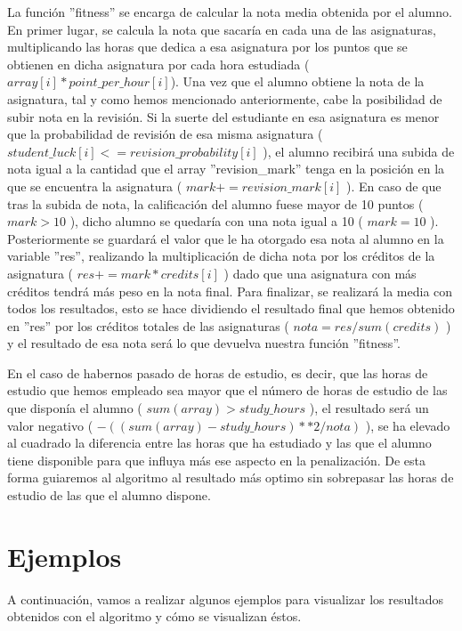 \documentclass[11pt, a4paper, titlepage]{article}
\begin{document}
La función ''fitness'' se encarga de calcular la nota media obtenida por el alumno. En primer lugar, se calcula la nota que sacaría en cada una de las asignaturas, multiplicando las horas que dedica a esa asignatura por los puntos que se obtienen en dicha asignatura por cada hora estudiada ($ array[i] * point\_per\_hour[i] $). Una vez que el alumno obtiene la nota de la asignatura, tal y como hemos mencionado anteriormente, cabe la posibilidad de subir nota en la revisión. Si la suerte del estudiante en esa asignatura es menor que la probabilidad de revisión de esa misma asignatura ( $ student\_luck[i] <= revision\_probability[i] $ ), el alumno recibirá una subida de nota igual a la cantidad que el array ''revision\_mark'' tenga en la posición en la que se encuentra la asignatura ( $ mark += revision\_mark[i] $ ). En caso de que tras la subida de nota, la calificación del alumno fuese mayor de 10 puntos ( $ mark > 10 $ ), dicho alumno se quedaría con una nota igual a 10 ( $ mark = 10 $ ). Posteriormente se guardará el valor que le ha otorgado esa nota al alumno en la variable ''res'', realizando la multiplicación de dicha nota por los créditos de la asignatura ( $ res += mark * credits[i] $ ) dado que una asignatura con más créditos tendrá más peso en la nota final. Para finalizar, se realizará la media con todos los resultados, esto se hace dividiendo el resultado final que hemos obtenido en ''res'' por los créditos totales de las asignaturas ( $ nota = res / sum(credits) $ ) y el resultado de esa nota será lo que devuelva nuestra función ''fitness''.

\vspace{5mm}

En el caso de habernos pasado de horas de estudio, es decir, que las horas de estudio que hemos empleado sea mayor que el número de horas de estudio de las que disponía el alumno ( $sum(array) > study\_hours$ ), el resultado será un valor negativo ( $ -((sum(array) - study\_hours) ** 2 / nota)$ ), se ha elevado al cuadrado la diferencia entre las horas que ha estudiado y las que el alumno tiene disponible para que influya más ese aspecto en la penalización. De esta forma guiaremos al algoritmo al resultado más optimo sin sobrepasar las horas de estudio de las que el alumno dispone.



\section{Ejemplos}
A continuación, vamos a realizar algunos ejemplos para visualizar los resultados obtenidos con el algoritmo y cómo se visualizan éstos.
\end{document}
